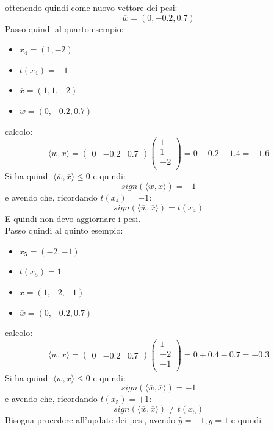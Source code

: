 \documentclass[a4paper,12pt, oneside]{book}
\begin{document}
\begin{esercizio}
  ottenendo quindi come nuovo vettore dei pesi:
  \[\overline{w}=(0, -0.2, 0.7)\]
  Passo quindi al quarto esempio:
  \begin{itemize}
    \item $x_4=(1,-2)$
    \item $t(x_4)=-1$
    \item $\overline{x}=(1,1,-2)$
    \item $\overline{w}=(0, -0.2, 0.7)$
  \end{itemize}
  calcolo:
  \[\langle \overline{w}, \overline{x}\rangle=
    \left(\begin{matrix}
        0 & -0.2 & 0.7
      \end{matrix}\right)
    \left(
      \begin{matrix}
        1 \\
        1 \\
        -2 \\
      \end{matrix}
    \right)= 0-0.2-1.4 = -1.6
  \]
  Si ha quindi $\langle \overline{w}, \overline{x}\rangle \leq 0$ e quindi:
  \[sign(\langle \overline{w}, \overline{x}\rangle)=-1\]
  e avendo che, ricordando $t(x_4)=-1$:
  \[sign(\langle \overline{w}, \overline{x}\rangle)= t(x_4)\]
  E quindi non devo aggiornare i pesi.\\
   Passo quindi al quinto esempio:
  \begin{itemize}
    \item $x_5=(-2,-1)$
    \item $t(x_5)=1$
    \item $\overline{x}=(1,-2,-1)$
    \item $\overline{w}=(0, -0.2, 0.7)$
  \end{itemize}
  calcolo:
  \[\langle \overline{w}, \overline{x}\rangle=
    \left(\begin{matrix}
        0 & -0.2 & 0.7
      \end{matrix}\right)
    \left(
      \begin{matrix}
        1 \\
        -2 \\
        -1 \\
      \end{matrix}
    \right)= 0+0.4-0.7 = -0.3
  \]
  Si ha quindi $\langle \overline{w}, \overline{x}\rangle \leq 0$ e quindi:
  \[sign(\langle \overline{w}, \overline{x}\rangle)=-1\]
  e avendo che, ricordando $t(x_5)=+1$:
  \[sign(\langle \overline{w}, \overline{x}\rangle)\neq t(x_5)\]
  Bisogna procedere all'update dei pesi, avendo $\hat{y}=-1, y=1$ e quindi

\end{esercizio}
\end{document}
